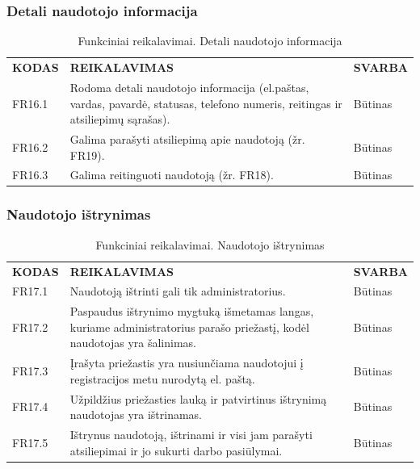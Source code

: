 \documentclass{VUMIFPSkursinis}
\begin{document}
\subsubsection{Detali naudotojo informacija}
\begin{table}[H]
\caption{Funkciniai reikalavimai. Detali naudotojo informacija}
\centering
\normalsize
\begin{tabular}{|p{2cm}|p{10cm}|p{3cm}|}
\hline
\rowcolor{gray!30}
\multicolumn{3}{|l|}{\textbf{16. Detali naudotojo informacija}} \\ \hline
\textbf{KODAS}& \multicolumn{1}{m{10cm}|}{\textbf{REIKALAVIMAS}} & \textbf{SVARBA} \\ \hline
FR16.1 & \multicolumn{1}{m{10cm}|}{Rodoma detali naudotojo informacija (el.paštas, vardas, pavardė, statusas, telefono numeris, reitingas ir atsiliepimų sąrašas).} & Būtinas \\ \hline
FR16.2 & \multicolumn{1}{m{10cm}|}{Galima parašyti atsiliepimą apie naudotoją (žr. FR19).} & Būtinas \\ \hline
FR16.3 & \multicolumn{1}{m{10cm}|}{Galima reitinguoti naudotoją (žr. FR18).} & Būtinas \\ \hline
\end{tabular}
\end{table}

\subsubsection{Naudotojo ištrynimas}
\begin{table}[H]
\caption{Funkciniai reikalavimai. Naudotojo ištrynimas}
\centering
\normalsize
\begin{tabular}{|p{2cm}|p{10cm}|p{3cm}|}
\hline
\rowcolor{gray!30}
\multicolumn{3}{|l|}{\textbf{17. Naudotojo ištrynimas}} \\ \hline
\textbf{KODAS}& \multicolumn{1}{m{10cm}|}{\textbf{REIKALAVIMAS}} & \textbf{SVARBA} \\ \hline
FR17.1 & \multicolumn{1}{m{10cm}|}{Naudotoją ištrinti gali tik administratorius.} & Būtinas \\ \hline
FR17.2 & \multicolumn{1}{m{10cm}|}{Paspaudus ištrynimo mygtuką išmetamas langas, kuriame administratorius parašo priežastį, kodėl naudotojas yra šalinimas.} & Būtinas \\ \hline
FR17.3 & \multicolumn{1}{m{10cm}|}{Įrašyta priežastis yra nusiunčiama naudotojui į registracijos metu nurodytą el. paštą.} & Būtinas \\ \hline
FR17.4 & \multicolumn{1}{m{10cm}|}{Užpildžius priežasties lauką ir patvirtinus ištrynimą naudotojas yra ištrinamas.} & Būtinas \\ \hline
FR17.5 & \multicolumn{1}{m{10cm}|}{Ištrynus naudotoją, ištrinami ir visi jam parašyti atsiliepimai ir jo sukurti darbo pasiūlymai.} & Būtinas \\ \hline
\end{tabular}
\end{table}
\end{document}
